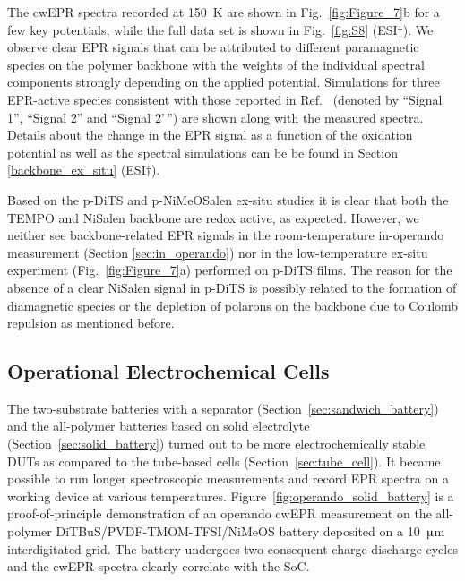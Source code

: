 The cwEPR spectra recorded at 150~K are shown in Fig.~\ref{fig:Figure_7}b for a few key potentials, while the full data set is shown in Fig.~\ref{fig:S8} (ESI$\dag$). We observe clear EPR signals that can be attributed to different paramagnetic species on the polymer backbone with the weights of the individual spectral components strongly depending on the applied potential. Simulations for three EPR-active species consistent with those reported in Ref.~\cite{Dmitrieva2018} (denoted by ``Signal 1'', ``Signal 2'' and ``Signal 2'\,'') are shown along with the measured spectra. Details about the change in the EPR signal as a function of the oxidation potential as well as the spectral simulations can be be found in Section \ref{backbone_ex_situ} (ESI$\dag$).

%
\par

Based on the p-DiTS and p-NiMeOSalen ex-situ studies it is clear that both the TEMPO and NiSalen backbone are redox active, as expected. However, we neither see backbone-related EPR signals in the room-temperature in-operando measurement (Section \ref{sec:in_operando}) nor in the low-temperature ex-situ experiment (Fig.~\ref{fig:Figure_7}a) performed on p-DiTS films. The reason for the absence of a clear NiSalen signal in p-DiTS is possibly related to the formation of diamagnetic species or the depletion of polarons on the backbone due to Coulomb repulsion as mentioned before.


\subsection{Operational Electrochemical Cells}
\label{sec:all_polymer}
The two-substrate batteries with a separator (Section~\ref{sec:sandwich_battery}) and the all-polymer batteries based on solid electrolyte (Section~\ref{sec:solid_battery}) turned out to be more electrochemically stable DUTs as compared to the tube-based cells (Section~\ref{sec:tube_cell}). It became possible to run longer spectroscopic measurements and record EPR spectra on a working device at various temperatures. Figure~\ref{fig:operando_solid_battery} is a proof-of-principle demonstration of an operando cwEPR measurement on the all-polymer DiTBuS/PVDF-TMOM-TFSI/NiMeOS battery deposited on a 10~$\muup$m interdigitated grid. The battery undergoes two consequent charge-discharge cycles and the cwEPR spectra clearly correlate with the SoC. 

